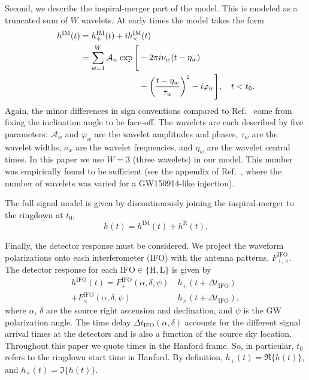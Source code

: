 Second, we describe the inspiral-merger part of the model.
This is modeled as a truncated sum of $W$ wavelets.
At early times the model takes the form
\begin{align} 
	h^\mathrm{IM}(t) &=  h_+^\mathrm{IM}(t) + ih_\times^\mathrm{IM}(t) \nonumber \\
	&= \sum_{w=1}^{W} \mathcal{A}_w \exp \Bigg[-2\pi i \nu_w(t-\eta_w) \label{eq:wavelets} \\
	&\hspace{2.46cm} - \qty(\frac{t-\eta_w}{\tau_w})^2 - i\varphi_w \Bigg], \quad t < t_0. \nonumber
\end{align}
Again, the minor differences in sign conventions compared to Ref.~\cite{Finch:2021qph} come from fixing the inclination angle to be face-off. 
The wavelets are each described by five parameters: $\mathcal{A}_w$ and $\varphi_w$ are the wavelet amplitudes and phases, $\tau_w$ are the wavelet widths, $\nu_w$ are the wavelet frequencies, and $\eta_w$ are the wavelet central times. 
In this paper we use $W=3$ (three wavelets) in our model.
This number was empirically found to be sufficient (see the appendix of Ref.~\cite{Finch:2021qph}, where the number of wavelets was varied for a GW150914-like injection).

The full signal model is given by discontinuously joining the inspiral-merger to the ringdown at $t_0$,
\begin{equation}
	h(t) = h^\mathrm{IM}(t) + h^\mathrm{R}(t).
\end{equation}

Finally, the detector response must be considered.
We project the waveform polarizations onto each interferometer (IFO) with the antenna patterns, $F^\mathrm{IFO}_{+,\times}$.
The detector response for each ${\mathrm{IFO}\in \{\mathrm{H}, \mathrm{L}\}}$ is given by
\begin{align} \label{ch4:eq:projection_antenna}
	h^\mathrm{IFO}(t) = F^\mathrm{IFO}_+(\alpha, \delta, \psi) ~ &h_+(t + \Delta t_\mathrm{IFO}) \nonumber \\
	+ F^\mathrm{IFO}_\times(\alpha, \delta, \psi) ~ &h_\times(t + \Delta t_\mathrm{IFO}),
\end{align}
where $\alpha$, $\delta$ are the source right ascension and declination, and $\psi$ is the GW polarization angle.
The time delay $\Delta t_\mathrm{IFO}(\alpha, \delta)$ accounts for the different signal arrival times at the detectors and is also a function of the source sky location.
Throughout this paper we quote times in the Hanford frame.
So, in particular, $t_0$ refers to the ringdown start time in Hanford.
By definition, $h_+(t) = \Re\{ h(t) \}$, and $h_\times(t) = \Im \{ h(t) \}$.


